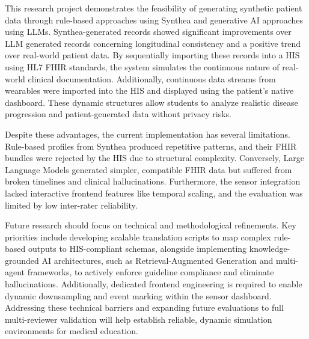 This research project demonstrates the feasibility of generating synthetic patient data through rule-based approaches using Synthea and generative AI approaches using LLMs. Synthea-generated records showed significant improvements over LLM generated records concerning longitudinal consistency and a positive trend over real-world patient data. By sequentially importing these records into a HIS using HL7 FHIR standards, the system simulates the continuous nature of real-world clinical documentation. Additionally, continuous data streams from wearables were imported into the HIS and displayed using the patient's native dashboard. These dynamic structures allow students to analyze realistic disease progression and patient-generated data without privacy risks.

Despite these advantages, the current implementation has several limitations. Rule-based profiles from Synthea produced repetitive patterns, and their FHIR bundles were rejected by the HIS due to structural complexity. Conversely, Large Language Models generated simpler, compatible FHIR data but suffered from broken timelines and clinical hallucinations. Furthermore, the sensor integration lacked interactive frontend features like temporal scaling, and the evaluation was limited by low inter-rater reliability.

Future research should focus on technical and methodological refinements. Key priorities include developing scalable translation scripts to map complex rule-based outputs to HIS-compliant schemas, alongside implementing knowledge-grounded AI architectures, such as Retrieval-Augmented Generation and multi-agent frameworks, to actively enforce guideline compliance and eliminate hallucinations. Additionally, dedicated frontend engineering is required to enable dynamic downsampling and event marking within the sensor dashboard. Addressing these technical barriers and expanding future evaluations to full multi-reviewer validation will help establish reliable, dynamic simulation environments for medical education.
